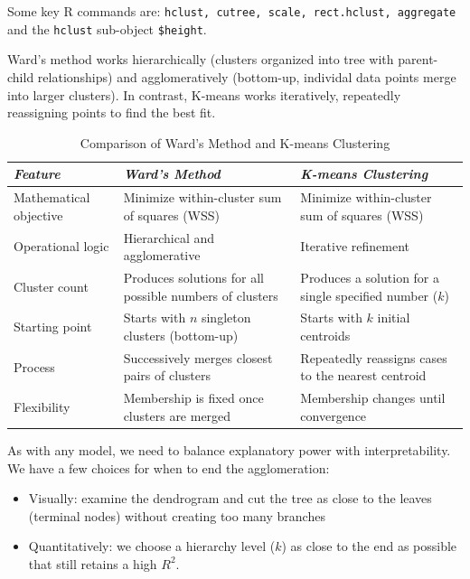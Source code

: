 \medskip

Some key R commands are: \texttt{hclust, cutree, scale, rect.hclust, aggregate} and the \texttt{hclust} sub-object \texttt{\$height}.

Ward's method works hierarchically (clusters organized into tree with parent-child relationships) and agglomeratively (bottom-up, individal data points merge into larger clusters). In contrast, K-means works iteratively, repeatedly reassigning points to find the best fit. 

\medskip

    \begin{table}[H]
\centering
\renewcommand{\arraystretch}{1.5}
\begin{tabularx}{0.9\textwidth}{l X X}
\toprule
\textit{Feature} 
& \textit{Ward's Method} 
& \textit{K-means Clustering} \\
\midrule
Mathematical objective 
& Minimize within-cluster sum of squares (WSS) 
& Minimize within-cluster sum of squares (WSS) \\

Operational logic 
& Hierarchical and agglomerative 
& Iterative refinement \\

Cluster count 
& Produces solutions for all possible numbers of clusters 
& Produces a solution for a single specified number ($k$) \\

Starting point 
& Starts with $n$ singleton clusters (bottom-up) 
& Starts with $k$ initial centroids \\

Process 
& Successively merges closest pairs of clusters 
& Repeatedly reassigns cases to the nearest centroid \\

Flexibility 
& Membership is fixed once clusters are merged 
& Membership changes until convergence \\
\bottomrule
\end{tabularx}
\caption*{Comparison of Ward's Method and K-means Clustering}
\end{table}

\medskip

As with any model, we need to balance explanatory power with interpretability. We have a few choices for when to end the agglomeration:
\begin{itemize}
    \item Visually: examine the dendrogram and cut the tree as close to the leaves (terminal nodes) without creating too many branches
    \item Quantitatively: we choose a hierarchy level ($k$) as close to the end as possible that still retains a high $R^2$. 
\end{itemize}

